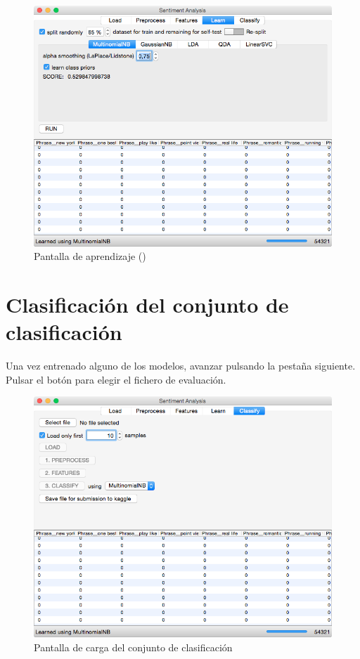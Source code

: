 \begin{figure}[H]
\centering
\includegraphics[width=12cm]{ss-06-learn-tab}
\caption{Pantalla de aprendizaje ()}
\label{fig:ss-06-learn-tab}
\end{figure}

\newpage
\section{Clasificación del conjunto de clasificación}

Una vez entrenado alguno de los modelos, avanzar pulsando la pestaña siguiente. Pulsar el botón  para elegir el fichero  de evaluación.

\begin{figure}[H]
\centering
\includegraphics[width=12cm]{ss-07-classify-tab}
\caption{Pantalla de carga del conjunto de clasificación}
\label{fig:ss-07-classify-tab}
\end{figure}

